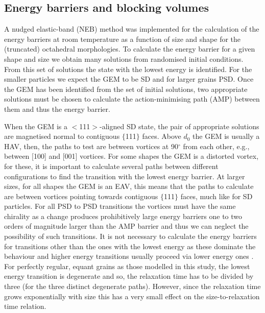 \documentclass[review,authoryear]{elsarticle}
\begin{document}
\subsection{Energy barriers and blocking volumes}
A nudged elastic-band (NEB) method \citep{Fabian2017} was implemented for the calculation of the energy barriers at room temperature as a function of size and shape for the (truncated) octahedral morphologies. To calculate the energy barrier for a given shape and size we obtain many solutions from randomised initial conditions. From this set of solutions the state with the lowest energy is identified. For the smaller particles we expect the GEM to be SD and for larger grains PSD. Once the GEM has been identified from the set of initial solutions, two appropriate solutions must be chosen to calculate the action-minimising path (AMP) between them and thus the energy barrier.\par

When the GEM is a $<$111$>$-aligned SD state, the pair of appropriate solutions are magnetised normal to contiguous $\{$111$\}$ faces. Above $d_0$ the GEM is usually a HAV, then, the paths to test are between vortices at 90$^{\circ}$ from each other, e.g., between [100] and [001] vortices. For some shapes the GEM is a distorted vortex, for these, it is important to calculate several paths between different configurations to find the transition with the lowest energy barrier. At larger sizes, for all shapes the GEM is an EAV, this means that the paths to calculate are between vortices pointing towards contiguous $\{$111$\}$ faces, much like for SD particles. For all PSD to PSD transitions the vortices must have the same chirality as a change produces prohibitively large energy barriers one to two orders of magnitude larger than the AMP barrier and thus we can neglect the possibility of such transitions. It is not necessary to calculate the energy barriers for transitions other than the ones with the lowest energy as these dominate the behaviour and higher energy transitions usually proceed via lower energy ones \citep{Nagy2017}. For perfectly regular, equant grains as those modelled in this study, the lowest energy transition is degenerate and so, the relaxation time has to be divided by three (for the three distinct degenerate paths). However, since the relaxation time grows exponentially with size \citep{Nagy2017} this has a very small effect on the size-to-relaxation time relation.\par
\end{document}
